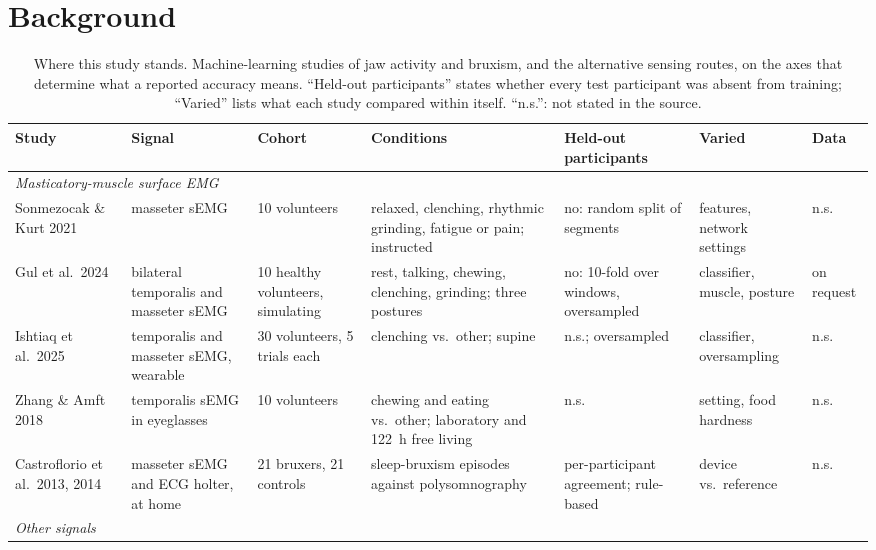 \documentclass[pdflatex,sn-nature,iicol]{sn-jnl}
\begin{document}
\section{Background}


\begin{table}[h]
  \centering
  \caption{Where this study stands. Machine-learning studies of jaw activity and bruxism, and the alternative sensing routes, on the axes that determine what a reported accuracy means. ``Held-out participants'' states whether every test participant was absent from training; ``Varied'' lists what each study compared within itself. ``n.s.'': not stated in the source.}
  \label{tab:positioning}
  \footnotesize
  \begin{tabular*}{\textwidth}{@{\extracolsep{\fill}}p{}p{}p{}p{}p{}p{}p{}@{}}
    \toprule
    Study & Signal & Cohort & Conditions & Held-out participants & Varied & Data \\
    \midrule
    \multicolumn{7}{l}{\emph{Masticatory-muscle surface EMG}}\\
    Sonmezocak \& Kurt 2021~\cite{sonmezocak2021detection} & masseter sEMG & 10 volunteers & relaxed, clenching, rhythmic grinding, fatigue or pain; instructed & no: random split of segments & features, network settings & n.s. \\
    Gul et al.\ 2024~\cite{gul2024advanced} & bilateral temporalis and masseter sEMG & 10 healthy volunteers, simulating & rest, talking, chewing, clenching, grinding; three postures & no: 10-fold over windows, oversampled & classifier, muscle, posture & on request \\
    Ishtiaq et al.\ 2025~\cite{ishtiaq2025wearable} & temporalis and masseter sEMG, wearable & 30 volunteers, 5 trials each & clenching vs.\ other; supine & n.s.; oversampled & classifier, oversampling & n.s. \\
    Zhang \& Amft 2018~\cite{zhang2018monitoring} & temporalis sEMG in eyeglasses & 10 volunteers & chewing and eating vs.\ other; laboratory and 122~h free living & n.s. & setting, food hardness & n.s. \\
    Castroflorio et al.\ 2013, 2014~\cite{castroflorio2013use,castroflorio2014detection} & masseter sEMG and ECG holter, at home & 21 bruxers, 21 controls & sleep-bruxism episodes against polysomnography & per-participant agreement; rule-based & device vs.\ reference & n.s. \\
    \midrule
    \multicolumn{7}{l}{\emph{Other signals}}\\

\end{tabular*}
\end{table}
\end{document}
